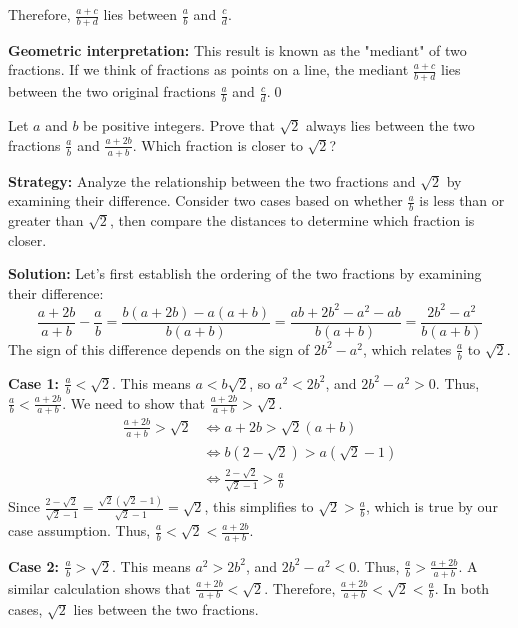 Therefore, $\frac{a + c}{b + d}$ lies between $\frac{a}{b}$ and $\frac{c}{d}$.

\textbf{Geometric interpretation:}
This result is known as the "mediant" of two fractions. If we think of fractions as points on a line, the mediant $\frac{a + c}{b + d}$ lies between the two original fractions $\frac{a}{b}$ and $\frac{c}{d}$.\qed


\begin{problembox}
Let $a$ and $b$ be positive integers. Prove that $\sqrt{2}$ always lies between the two fractions $\frac{a}{b}$ and $\frac{a + 2b}{a + b}$. Which fraction is closer to $\sqrt{2}$?
\end{problembox}

\noindent\textbf{Strategy:} Analyze the relationship between the two fractions and $\sqrt{2}$ by examining their difference. Consider two cases based on whether $\frac{a}{b}$ is less than or greater than $\sqrt{2}$, then compare the distances to determine which fraction is closer.

\bigskip\noindent\textbf{Solution:}
Let's first establish the ordering of the two fractions by examining their difference:
\[
\frac{a + 2b}{a + b} - \frac{a}{b} = \frac{b(a + 2b) - a(a + b)}{b(a + b)} = \frac{ab + 2b^2 - a^2 - ab}{b(a + b)} = \frac{2b^2 - a^2}{b(a + b)}
\]
The sign of this difference depends on the sign of $2b^2 - a^2$, which relates $\frac{a}{b}$ to $\sqrt{2}$.

\textbf{Case 1: $\frac{a}{b} < \sqrt{2}$}. This means $a < b\sqrt{2}$, so $a^2 < 2b^2$, and $2b^2 - a^2 > 0$.
Thus, $\frac{a}{b} < \frac{a+2b}{a+b}$. We need to show that $\frac{a+2b}{a+b} > \sqrt{2}$.
\begin{align*}
\frac{a + 2b}{a + b} > \sqrt{2} &\iff a + 2b > \sqrt{2}(a + b)\\
&\iff b(2 - \sqrt{2}) > a(\sqrt{2} - 1)\\
&\iff \frac{2 - \sqrt{2}}{\sqrt{2} - 1} > \frac{a}{b}
\end{align*}
Since $\frac{2 - \sqrt{2}}{\sqrt{2} - 1} = \frac{\sqrt{2}(\sqrt{2} - 1)}{\sqrt{2} - 1} = \sqrt{2}$, this simplifies to $\sqrt{2} > \frac{a}{b}$, which is true by our case assumption. Thus, $\frac{a}{b} < \sqrt{2} < \frac{a + 2b}{a + b}$.

\textbf{Case 2: $\frac{a}{b} > \sqrt{2}$}. This means $a^2 > 2b^2$, and $2b^2 - a^2 < 0$.
Thus, $\frac{a}{b} > \frac{a+2b}{a+b}$. A similar calculation shows that $\frac{a+2b}{a+b} < \sqrt{2}$.
Therefore, $\frac{a+2b}{a+b} < \sqrt{2} < \frac{a}{b}$. In both cases, $\sqrt{2}$ lies between the two fractions.

